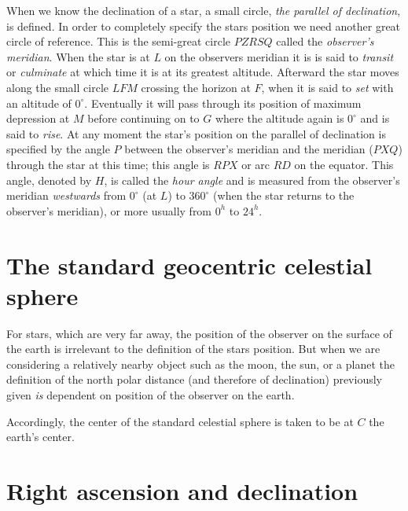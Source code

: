 When we know the declination of a star, a small circle, {\it the
  parallel of declination}, is defined. In order to completely
specify the stars position we need another great circle of
reference. This is the semi-great circle $PZRSQ$ called the {\it
  observer's meridian}. When the star is at $L$ on the observers
meridian it is is said to {\it transit} or {\it culminate} at which
time it is at its greatest altitude. Afterward the star moves along
the small circle $LFM$ crossing the horizon at $F$, when it is said to
{\it set} with an altitude of $0^\circ$. Eventually it will pass through
its position of maximum depression at $M$ before continuing on to $G$
where the altitude again is $0^\circ$ and is said to {\it rise}. At
any moment the star's position on the parallel of declination is
specified by the angle $P$ between the observer's meridian and the
meridian ($PXQ$) through the star at this time; this angle is $RPX$ or
arc $RD$ on the equator. This angle, denoted by $H$, is called the
{\it hour angle} and is measured from the observer's meridian {\it
  westwards} from $0^\circ$ (at $L$) to $360^\circ$ (when the star
returns to the observer's meridian), or more usually from $0^h$ to 
$24^h$. 

\section{The standard geocentric celestial sphere}


For stars, which are very far away, the position of the observer on
the surface of the earth is irrelevant to the definition of the stars
position. But when we are considering a relatively nearby object such
as the moon, the sun, or a planet the definition of the north polar
distance (and therefore of declination) previously given {\it is}
dependent on position of the observer on the earth. 

Accordingly, the center of the standard celestial sphere is taken to
be at $C$ the earth's center. 

\section{Right ascension and declination}

